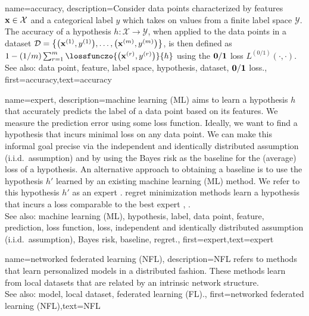 {name={accuracy},
	description={Consider data points characterized by features ${\bf x} \in \mathcal{X}$ and 
		a categorical label $y$ which takes on values from a finite label space $\mathcal{Y}$. The 
		accuracy of a hypothesis $h: \mathcal{X} \rightarrow \mathcal{Y}$, when applied 
		to the data points in a dataset $\mathcal{D} = \big\{ \big({\bf x}^{(1)}, y^{(1)} \big), \ldots, \big({\bf x}^{(m)},y^{(m)}\big) \big\}$, 
		is then defined as $1 - (1/m)\sum_{r=1}^{m} \lossfunczo{\big({\bf x}^{(r)},y^{(r)}\big)}{h}$ using the $\bf 0/1$ loss $L^{(0/1)}\left(\cdot,\cdot \right)$.
					\\ 
		See also: data point, feature, label space, hypothesis, dataset, $\bf 0/1$ loss.},
	first={accuracy},text={accuracy} 
}





{name={expert},
	description={machine learning (ML) aims to learn a hypothesis $h$ that accurately predicts the label 
		of a data point based on its features. We measure the prediction error using 
		some loss function. Ideally, we want to find a hypothesis that incurs minimal loss 
		on any data point. We can make this informal goal precise via the independent and identically distributed assumption (i.i.d.\ assumption) 
		and by using the Bayes risk as the baseline for the (average) loss of a hypothesis. 
		An alternative approach to obtaining a baseline is to use the hypothesis $h'$ learned 
		by an existing machine learning (ML) method. We refer to this hypothesis $h'$ as an expert \cite{PredictionLearningGames}. \Gls{regret} minimization methods learn a hypothesis
		that incurs a loss comparable to the best expert \cite{PredictionLearningGames}, \cite{HazanOCO}.
					\\ 
		See also: machine learning (ML), hypothesis, label, data point, feature, prediction, loss function, loss, independent and identically distributed assumption (i.i.d.\ assumption), Bayes risk, baseline, regret.},
	first={expert},text={expert} 
}

{name={networked federated learning (NFL)},
	description={NFL refers 
		to methods that learn personalized models in a distributed fashion. These methods learn from local datasets 
		that are related by an intrinsic network structure.
					\\ 
		See also: model, local dataset, federated learning (FL).},
 first={networked federated learning (NFL)},text={NFL} 
}




